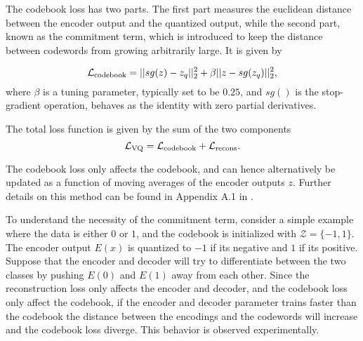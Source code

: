 \documentclass[../../thesis.tex]{subfiles}
\begin{document}
The codebook loss has two parts. The first part measures the euclidean distance between the encoder output and the quantized output, while the second part, known as the commitment term, which is introduced to keep the distance between codewords from growing arbitrarily large. It is given by 

\begin{equation}
    \mathcal{L}_{\text{codebook}} = ||sg(z) - z_q||_2^2 +\beta||z - sg(z_q)||_2^2,
\end{equation}
where $\beta$ is a tuning parameter, typically set to be $0.25$, and $sg()$ is the stop-gradient operation, behaves as the identity with zero partial derivatives. \newline

The total loss function is given by the sum of the two components
    \begin{equation}     
        \label{eq:VQVAELoss}
            \mathcal{L}_{\text{VQ}} = \mathcal{L}_{\text{codebook}} + \mathcal{L}_{\text{recons}}.
    \end{equation}

The codebook loss only affects the codebook, and can hence alternatively be updated as a function of moving averages of the encoder outputs $z$. Further details on this method can be found in Appendix A.1 in \cite{VQVAE}.\newline 

To understand the necessity of the commitment term, consider a simple example where the data is either $0$ or $1$, and the codebook is initialized with $\mathcal{Z} = \{-1,1\}$. The encoder output $E(x)$ is quantized to $-1$ if its negative and $1$ if its positive. Suppose that the encoder and decoder will try to differentiate between the two classes by pushing $E(0)$ and $E(1)$ away from each other. Since the reconstruction loss only affects the encoder and decoder, and the codebook loss only affect the codebook, if the encoder and decoder parameter trains faster than the codebook the distance between the encodings and the codewords will increase and the codebook loss diverge. This behavior is observed experimentally.
\end{document}
